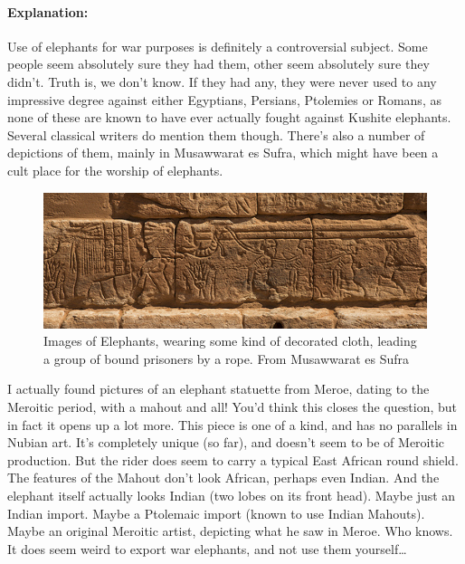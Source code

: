 \documentclass[a4paper,12pt]{scrreprt}
\begin{document}
\paragraph{Explanation:}

Use of elephants for war purposes is definitely a controversial subject. Some people seem absolutely sure they had them, other seem absolutely sure they didn't. Truth is, we don't know. If they had any, they were never used to any impressive degree against either Egyptians, Persians, Ptolemies or Romans, as none of these are known to have ever actually fought against Kushite elephants. Several classical writers do mention them though. There's also a number of depictions of them, mainly in Musawwarat es Sufra, which might have been a cult place for the worship of elephants.\\

\begin{figure}[H]
	\centering
	\includegraphics[width=\textwidth]{img/slaves_and_elephant}
	\caption{Images of Elephants, wearing some kind of decorated cloth, leading a group of bound prisoners by a rope. From Musawwarat es Sufra}
\end{figure}

I actually found pictures of an elephant statuette from Meroe, dating to the Meroitic period, with a mahout and all! You'd think this closes the question, but in fact it opens up a lot more. This piece is one of a kind, and has no parallels in Nubian art. It's completely unique (so far), and doesn't seem to be of Meroitic production. But the rider does seem to carry a typical East African round shield. The features of the Mahout don't look African, perhaps even Indian. And the elephant itself actually looks Indian (two lobes on its front head). Maybe just an Indian import. Maybe a Ptolemaic import (known to use Indian Mahouts). Maybe an original Meroitic artist, depicting what he saw in Meroe. Who knows. It does seem weird to export war elephants, and not use them yourself…\\
\end{document}
